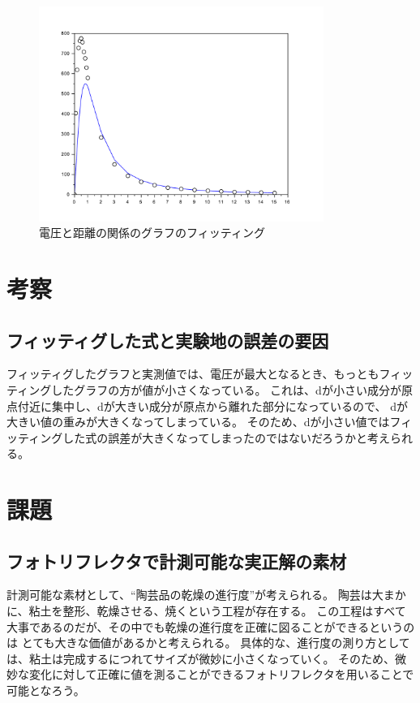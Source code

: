\documentclass[11pt,a4j]{jsarticle}
\makeatletter
\newcommand{\figcaption}[1]{\def\@captype{figure}\caption{#1}}
\makeatother
\begin{document}
\begin{figure}[H]
  \centering
  \includegraphics[height=70mm,bb=0 0 610 480]{image/fig3.pdf}
  \figcaption{電圧と距離の関係のグラフのフィッティング}
  \label{fig:fig3}
\end{figure}

\section{考察}
\label{sec:考察}

\subsection{フィッティグした式と実験地の誤差の要因}
\label{sub:フィッティグした式と実験地の誤差の要因}


フィッティグしたグラフと実測値では、電圧が最大となるとき、もっともフィッティングしたグラフの方が値が小さくなっている。
これは、dが小さい成分が原点付近に集中し、dが大きい成分が原点から離れた部分になっているので、
dが大きい値の重みが大きくなってしまっている。
そのため、dが小さい値ではフィッティングした式の誤差が大きくなってしまったのではないだろうかと考えられる。

\section{課題}
\label{sec:課題}

\subsection{フォトリフレクタで計測可能な実正解の素材}
\label{sub:フォトリフレクタで計測可能な実正解の素材}

計測可能な素材として、``陶芸品の乾燥の進行度''が考えられる。
陶芸は大まかに、粘土を整形、乾燥させる、焼くという工程が存在する。
この工程はすべて大事であるのだが、その中でも乾燥の進行度を正確に図ることができるというのは
とても大きな価値があるかと考えられる。
具体的な、進行度の測り方としては、粘土は完成するにつれてサイズが微妙に小さくなっていく。
そのため、微妙な変化に対して正確に値を測ることができるフォトリフレクタを用いることで可能となろう。
\end{document}
